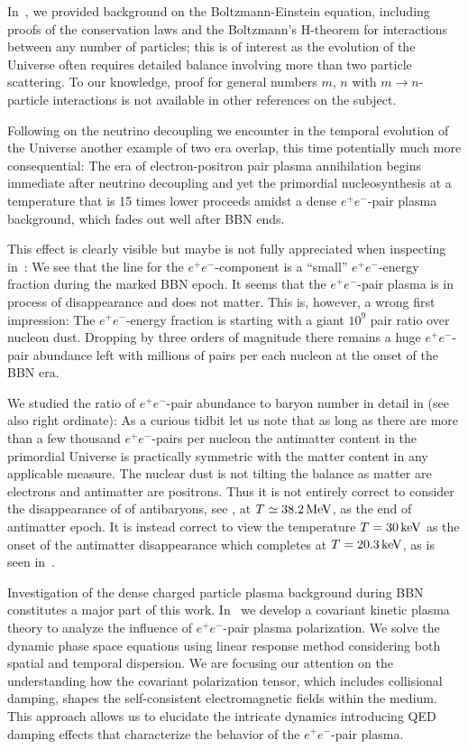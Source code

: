 In~, we provided background on the Boltzmann-Einstein equation, including proofs of the conservation laws and the Boltzmann's H-theorem for interactions between any number of particles; this is of interest as the evolution of the Universe often requires detailed balance involving more than two particle scattering. To our knowledge, proof for general numbers $m$, $n$ with $m\to n$-particle interactions is not available in other references on the subject.

Following on the neutrino decoupling we encounter in the temporal evolution of the Universe another example of two era overlap, this time potentially much more consequential: The era of electron-positron pair plasma annihilation begins immediate after neutrino decoupling and yet the primordial nucleosynthesis at a temperature that is 15 times lower proceeds amidst a dense $e^+e^-$-pair plasma background, which fades out well after BBN ends. 

This effect is clearly visible but maybe is not fully appreciated when inspecting in~: We see that the line for the $e^+e^-$-component is a ``small'' $e^+e^-$-energy fraction during the marked BBN epoch. It seems that the $e^+e^-$-pair plasma is in process of disappearance and does not matter. This is, however, a wrong first impression: The $e^+e^-$-energy fraction is starting with a giant $10^9$ pair ratio over nucleon dust. Dropping by three orders of magnitude there remains a huge $e^+e^-$-pair abundance left with millions of pairs per each nucleon at the onset of the BBN era.

We studied the ratio of $e^+e^-$-pair abundance to baryon number in detail in  (see also  right ordinate): As a curious tidbit let us note that as long as there are more than a few thousand $e^+e^-$-pairs per nucleon the antimatter content in the primordial Universe is practically symmetric with the matter content in any applicable measure. The nuclear dust is not tilting the balance as matter are electrons and antimatter are positrons. Thus it is not entirely correct to consider the disappearance of of antibaryons, see , at $T\simeq 38.2\text{\,MeV}$, as the end of antimatter epoch. It is instead correct to view the temperature $T=30\text{\,keV}$ as the onset of the antimatter disappearance which completes at $T=20.3\text{\,keV}$, as is seen in~.

Investigation of the dense charged particle plasma background during BBN constitutes a major part of this work. In~ we develop a covariant kinetic plasma theory to analyze the influence of $e^+e^-$-pair plasma polarization. We solve the dynamic phase space equations using linear response method considering both spatial and temporal dispersion. We are focusing our attention on the understanding how the covariant polarization tensor, which includes collisional damping, shapes the self-consistent electromagnetic fields within the medium. This approach allows us to elucidate the intricate dynamics introducing QED damping effects that characterize the behavior of the $e^+e^-$-pair plasma.

